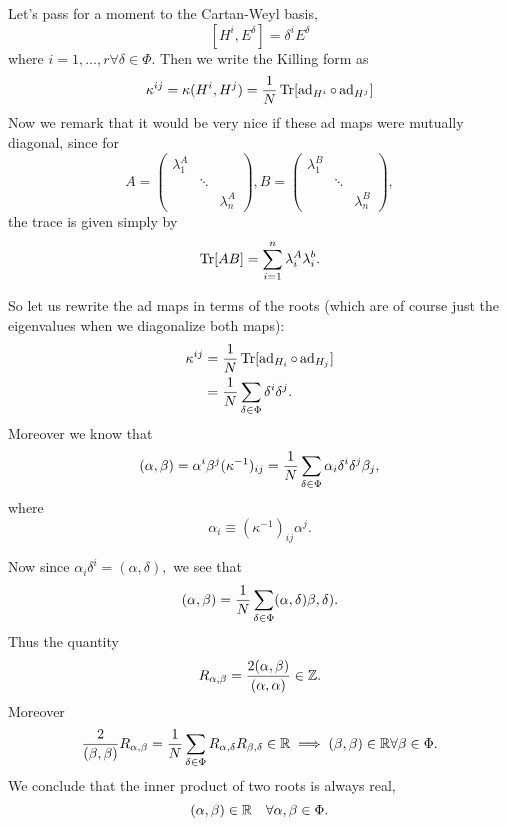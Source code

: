 Let's pass for a moment to the Cartan-Weyl basis,
$$[H^i,E^\delta]=\delta^i E^\delta$$
where $i=1,\ldots, r \forall \delta \in \Phi.$ Then we write the Killing form as
$$\kappa^{ij}=\kappa(H^i,H^j)=\frac{1}{N}\operatorname{Tr}[\operatorname{ad}_{H^i}\circ \operatorname{ad}_{H^j}]$$
Now we remark that it would be very nice if these ad maps were mutually diagonal, since for
$$A=\begin{pmatrix}
\lambda_1^A & &\\
 & \ddots & \\
 & & \lambda_n^A
\end{pmatrix}, B=\begin{pmatrix}
\lambda_1^B & &\\
 & \ddots & \\
 & & \lambda_n^B
\end{pmatrix},
$$
the trace is given simply by 
$$\operatorname{Tr}[AB]=\sum_{i=1}^n \lambda_i^A \lambda_i^b.$$

So let us rewrite the ad maps in terms of the roots (which are of course just the eigenvalues when we diagonalize both maps):
\begin{align*}
    \kappa^{ij}&=\frac{1}{N}\operatorname{Tr}[\operatorname{ad}_{H_i}\circ \operatorname{ad}_{H_j}]\\
    &= \frac{1}{N} \sum_{\delta\in\Phi} \delta^i \delta^j.
\end{align*}
Moreover we know that 
$$(\alpha,\beta)=\alpha^i \beta^j(\kappa^{-1})_{ij}=\frac{1}{N} \sum_{\delta\in \Phi} \alpha_i \delta^i \delta^j \beta_j,$$
where
$$\alpha_i \equiv (\kappa^{-1})_{ij}\alpha^j.$$

Now since $\alpha_i\delta^i=(\alpha,\delta),$ we see that
$$(\alpha,\beta)=\frac{1}{N}\sum_{\delta\in \Phi} (\alpha,\delta)\beta,\delta).$$
Thus the quantity
$$R_{\alpha,\beta}=\frac{2(\alpha,\beta)}{(\alpha,\alpha)}\in \mathbb{Z}.$$
Moreover
$$\frac{2}{(\beta,\beta)}R_{\alpha,\beta}=\frac{1}{N}\sum_{\delta\in \Phi}R_{\alpha,\delta}R_{\beta,\delta}\in \mathbb{R} \implies (\beta,\beta)\in\mathbb{R} \forall \beta\in \Phi.$$
We conclude that the inner product of two roots is always real,
$$(\alpha,\beta)\in \mathbb{R} \quad \forall \alpha,\beta\in\Phi.$$

